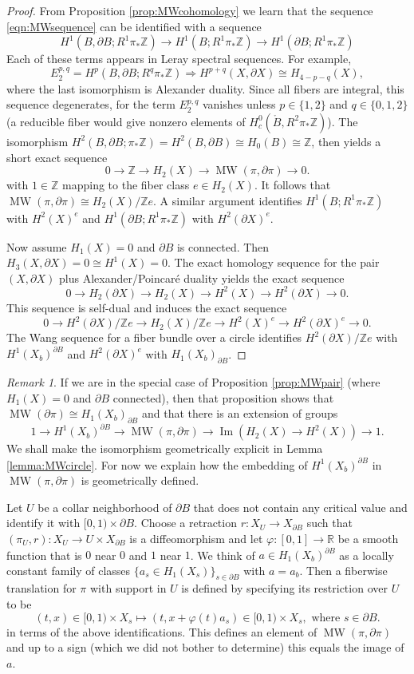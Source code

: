 \documentclass[10pt,letterpaper]{amsart}
\numberwithin{equation}{section}
\def\RR{{\mathbb R}}
\def\ZZ{{\mathbb Z}}
\newcommand{\p}{\partial}
\newcommand\im{\operatorname{Im}}
\newcommand\MW{\operatorname{MW}}
\theoremstyle{remark}
\newtheorem{remark}[theorem]{Remark}
\begin{document}
\begin{proof}
From Proposition \ref{prop:MWcohomology} we learn that the sequence \eqref{eqn:MWsequence} can be identified with a sequence
\[
H^1(B,\p B; R^1\pi_*\ZZ)\to H^1(B; R^1\pi_*\ZZ)\to H^1(\p B; R^1\pi_*\ZZ)
\]
Each of these terms  appears in    Leray spectral sequences. For example, 
 \[
 E^{p,q}_2=H^p(B,\p B; R^q\pi_*\ZZ)\Rightarrow H^{p+q}(X,\p X)\cong H_{4-p-q}(X),
 \]
where the last isomorphism is Alexander duality.  Since all  fibers are integral, 
 this sequence degenerates, for the term $E^{p,q}_2$ vanishes unless $p\in\{1,2\}$ and $q\in\{0,1,2\}$ (a reducible fiber would
 give nonzero elements of $H^0_c (\mathring{B}, R^2\pi_*\ZZ)$). The isomorphism  $H^2(B, \p B; \pi_*\ZZ)=H^2(B, \p B)\cong H_0(B)\cong \ZZ$, then yields a short exact sequence
 \[
 0\to \ZZ\to H_2(X)\to \MW(\pi, \p\pi)\to 0.
 \]
 with $1\in \ZZ$ mapping to the fiber class  $e\in H_2(X)$. It follows that  $\MW(\pi, \p\pi)\cong H_2(X)/\ZZ e$.
 A similar argument identifies $H^1(B; R^1\pi_*\ZZ)$ with $H^2(X)^e$ and $H^1(\p B; R^1\pi_*\ZZ)$ with $H^2(\p X)^e$.

Now assume $H_1(X)=0$ and $\p B $ is connected. Then 
$H_3(X, \p X)=0\cong  H^1(X)=0$. The exact homology sequence for the pair $(X,\p X)$ plus 
 Alexander/Poincar\'e duality yields the exact sequence 
 \[
0\to H_2(\p X)\to H_2(X)\to H^2(X)\to H^2(\p X)\to 0.
\]
This sequence is self-dual and induces the exact sequence 
 \[
0\to H^2(\p X)/\ZZ e\to H_2(X)/\ZZ e\to H^2(X)^e\to H^2(\p X)^e\to 0.
\]
The Wang sequence for a fiber bundle over a circle  identifies 
$H^2(\p X)/\ZZ e$ with $H^1(X_b)^{\p B}$ and $H^2(\p X)^e$ with $H_1(X_b)_{\p B}$.
\end{proof} 

\begin{remark}\label{rem:recipe}
If we are in the special case of  Proposition \ref{prop:MWpair} (where $H_1(X)=0$ and $\p B$ connected), then 
that proposition shows that $\MW(\p \pi)\cong H_1(X_b)_{\p B}$ and that there is an extension of groups
\[
1\to H^1(X_b)^{\p B}\to \MW(\pi, \p\pi)\to \im (H_2(X)\to H^2(X))\to 1.
\]
We shall make the isomorphism  geometrically explicit in Lemma \ref{lemma:MWcircle}.  For now we explain how the embedding of   $H^1(X_b)^{\p B}$ in $\MW(\pi, \p\pi)$  is geometrically defined.

Let $U$ be a collar neighborhood of $\p B$ that does not contain any critical value  and identify it with $[0,1)\times \p B$. Choose  
a retraction $r: X_U\to X_{\p B}$ such that $(\pi_U, r): X_U\to U\times X_{\p B}$ is a diffeomorphism and let $\varphi: [0,1]\to \RR$ be a smooth function that is $0$ near $0$ and $1$ near $1$. We think of  $a\in H_1(X_b)^{\p B}$ as 
a locally constant family of classes $\{a_s\in H_1(X_s)\}_{s\in \p B}$ with $a=a_b$. Then a fiberwise translation for $\pi$  with support in $U$ is defined by specifying its restriction over $U$ to be
\[
(t,x)\in [0,1)\times X_s\mapsto (t, x+\varphi(t)a_s)\in [0,1)\times  X_s, \text{ where   $s\in \p B$.}
\]
in terms of the above  identifications.
This defines an element of $\MW(\pi, \p\pi)$ and up to a sign (which we did not bother to determine) this equals the image of $a$. 
\end{remark}
\end{document}
